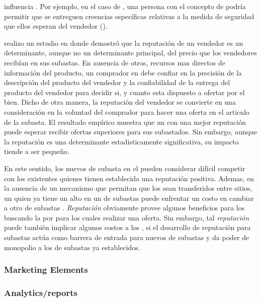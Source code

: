 \security influencia \trust. Por ejemplo, en el caso de \amazon, una persona \familiarity con el concepto de \secureintcom podría permitir que se entreguen creencias específicas relativas a la medida de seguridad que ellos esperan del vendedor (\trust)\cite{gefen2000commerce}.

\ebay realizo un estudio en donde demostró que la reputación \ecommerce de un vendedor es un determinante, aunque no un determinante principal, del precio que los vendedores recibían en sus subastas. En ausencia de otros, recursos mas directos de información del producto, un comprador en \internet debe confiar en la precisión de la descripción del producto del vendedor y la confiabilidad de la entrega del producto del vendedor para decidir si, y cuanto esta dispuesto a ofertar por el bien. Dicho de otra manera, la reputación del vendedor se convierte en una consideración en la voluntad del comprador para hacer una oferta en el articulo de la subasta. El resultado empírico muestra que un \seller con una mejor reputación puede esperar recibir ofertas superiores para sus \itemscommerce subastados. Sin embargo, aunque la reputación es una determinante estadisticamente significativa, su impacto tiende a ser pequeño\cite{melnik2002does}.

En este sentido, los nuevos \seller de subasta en el \websites pueden considerar difícil competir con los \sellers existentes quienes tienen establecida una reputación positiva. Ademas, en la ausencia de un mecanismo que permitan que los \ratings sean transferidos entre sitios, un \seller quien ya tiene un alto \rating en un \website de subastas \online puede enfrentar un costo en cambiar a otro \website de subastas \online. \textit{Reputación} obviamente provee algunos beneficios para los \consumers buscando  la \internet por \itemscommerce para los cuales realizar una oferta. Sin embargo, tal \textit{reputación} puede también implicar algunos costos a los \consumers, si el desarrollo de reputación para subastas \online actúa como barrera de entrada para nuevos \websites de  subastas \online  y da poder de monopolio a los \websites de subastas \online ya establecidos\cite{melnik2002does}.

\subsubsection{Marketing Elements}

\subsubsection{Analytics/reports}




